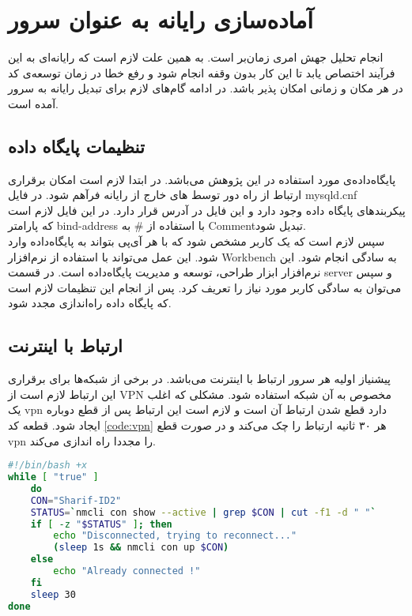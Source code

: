  
\chapter{آماده‌سازی رایانه به عنوان سرور}
\label{app:server}
انجام تحلیل جهش امری زمان‌بر است. به همین علت لازم است که رایانه‌ای به این فرآیند اختصاص یابد تا  این کار بدون وقفه انجام شود و رفع خطا در زمان توسعه‌ی کد در هر مکان و زمانی امکان پذیر باشد. در ادامه گام‌های لازم برای تبدیل رایانه به سرور آمده است. 

\section{تنظیمات پایگاه داده}
پایگاه‌داده‌ی  مورد استفاده در این پژوهش  می‌باشد. در ابتدا لازم است امکان برقراری ارتباط از راه دور توسط ‌های خارج از رایانه فرآهم شود. در فایل   mysqld.cnf پیکربندهای پایگاه داده وجود دارد و این فایل در آدرس 
قرار دارد. در این فایل لازم است که پارامتر bind-address با استفاده از \# به  {Comment}تبدیل شود. \\ 
سپس لازم است که یک کاربر مشخص شود که با هر آی‌پی بتواند به پایگاه‌داده وارد شود. این عمل می‌تواند با استفاده از نرم‌افزار  Workbench به سادگی انجام شود. این نرم‌افزار ابزار طراحی، توسعه و مدیریت پایگاه‌داده است. در قسمت server و سپس
  می‌توان به سادگی کاربر مورد نیاز را تعریف کرد. پس از انجام این تنظیمات لازم است که پایگاه داده راه‌اندازی مجدد شود. 
  
\section{ارتباط با اینترنت}
پیشنیاز اولیه هر سرور ارتباط با اینترنت می‌باشد. در برخی از شبکه‌ها برای برقراری این ارتباط لازم است از VPN مخصوص به آن شبکه استفاده شود. مشکلی که اغلب  یک vpn  دارد قطع شدن ارتباط آن است و لازم است این ارتباط پس از قطع دوباره ایجاد شود. قطعه کد  \ref{code:vpn} هر ۳۰ ثانیه ارتباط را چک می‌کند و در صورت قطع vpn را مجددا راه اندازی می‌کند. 




\begin{latin}
	\begin{lstlisting}[language=bash]
#!/bin/bash +x
while [ "true" ]
	do
	CON="Sharif-ID2"
	STATUS=`nmcli con show --active | grep $CON | cut -f1 -d " "`
	if [ -z "$STATUS" ]; then
		echo "Disconnected, trying to reconnect..."
		(sleep 1s && nmcli con up $CON)
	else
		echo "Already connected !"
	fi
	sleep 30
done
\end{lstlisting}
\end{latin}
\label{code:vpn}

